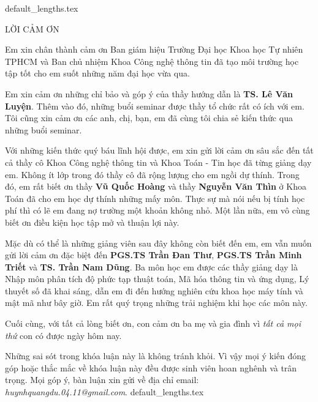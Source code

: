 \documentclass[class=report, crop=false]{standalone}
\begin{document}
	{default_lengths.tex}
	\hypertarget{acknowledgements}{}
	\thispagestyle{empty}
	\rmfamily\Large\bfseries
	\begin{center}
		LỜI CẢM ƠN
	\end{center}
	\normalsize\normalfont
	\par
	Em xin chân thành cảm ơn Ban giám hiệu Trường Đại học Khoa học Tự nhiên TPHCM và Ban chủ nhiệm Khoa Công nghệ thông tin đã tạo môi trường học tập tốt cho em suốt những năm đại học vừa qua.
	
	Em xin cảm ơn những chỉ bảo và góp ý của thầy hướng dẫn là \textbf{TS. Lê Văn Luyện}. Thêm vào đó, những buổi seminar được thầy tổ chức rất có ích với em. Tôi cũng xin cảm ơn các anh, chị, bạn, em đã cùng tôi chia sẻ kiến thức qua những buổi seminar.

	Với những kiến thức quý báu lĩnh hội được, em xin gửi lời cảm ơn sâu sắc đến tất cả thầy cô Khoa Công nghệ thông tin và Khoa Toán - Tin học đã từng giảng dạy em. Không ít lớp trong đó thầy cô đã rộng lượng cho em ngồi dự thính. Trong đó, em rất biết ơn thầy \textbf{Vũ Quốc Hoàng} và thầy \textbf{Nguyễn Văn Thìn} ở Khoa Toán đã cho em học dự thính những mấy môn. Thực sự mà nói nếu bị tính học phí thì có lẽ em đang nợ trường một khoản không nhỏ. Một lần nữa, em vô cùng biết ơn điều kiện học tập mở và thuận lợi này.

	Mặc dù có thể là những giảng viên sau đây không còn biết đến em, em vẫn muốn gửi lời cảm ơn đặc biệt đến \textbf{PGS.TS Trần Đan Thư}, \textbf{PGS.TS Trần Minh Triết} và \textbf{TS. Trần Nam Dũng}. Ba môn học em được các thầy giảng dạy là Nhập môn phân tích độ phức tạp thuật toán, Mã hóa thông tin và ứng dụng, Lý thuyết số đã khai sáng, dẫn em đi đến hướng nghiên cứu khoa học máy tính và mật mã như bây giờ. Em rất quý trọng những trải nghiệm khi học các môn này.

	Cuối cùng, với tất cả lòng biết ơn, con cảm ơn ba mẹ và gia đình vì \emph{tất cả mọi thứ} con có được ngày hôm nay.

	Những sai sót trong khóa luận này là không tránh khỏi. Vì vậy mọi ý kiến đóng góp hoặc thắc mắc về khóa luận này đều được sinh viên hoan nghênh và trân trọng. Mọi góp ý, bàn luận xin gửi về địa chỉ email: \textit{huynhquangdu.04.11@gmail.com}.
	\newpage
	{default_lengths.tex}
\end{document}
